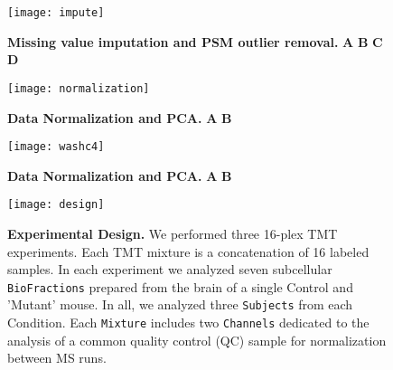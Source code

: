 \newpage


\begin{figure}[h] %
  \begin{fullwidth}
  \begin{center}
	  \texttt{[image: impute]}
	  \caption{\textbf{Missing value imputation and PSM outlier removal.}
	  \textbf{A} \textbf{B} \textbf{C} \textbf{D} }
	  \label{fig:impute}
  \end{center}
  \end{fullwidth}
\end{figure}

\newpage


\begin{figure}[h] %
  \begin{fullwidth}
  \begin{center}
	  \texttt{[image: normalization]}
	  \caption{\textbf{Data Normalization and PCA.} \textbf{A} \textbf{B} }
	  \label{fig:normalization}
  \end{center}
  \end{fullwidth}
\end{figure}

\newpage


\begin{figure}[h] %
  \begin{fullwidth}
  \begin{center}
	  \texttt{[image: washc4]}
	  \caption{\textbf{Data Normalization and PCA.} \textbf{A} \textbf{B} }
	  \label{fig:washc4}
  \end{center}
  \end{fullwidth}
\end{figure}

\newpage




\begin{figure}[h] %
  \begin{fullwidth}
  \begin{center}
	  \texttt{[image: design]}
	  \caption{\textbf{Experimental Design.} We performed three 16-plex TMT
	  experiments. Each TMT mixture is a concatenation of 16 labeled
	  samples. In each experiment we analyzed seven subcellular
	  \texttt{BioFractions} prepared from the brain of a single Control
	  and 'Mutant' mouse. In all, we analyzed three \texttt{Subjects} from 
	  each {Condition}. Each \texttt{Mixture} includes two \texttt{Channels}
	  dedicated to the analysis of a common quality control (QC) sample for
	  normalization between MS runs.}
	  \label{fig:design}
  \end{center}
  \end{fullwidth}
\end{figure}

